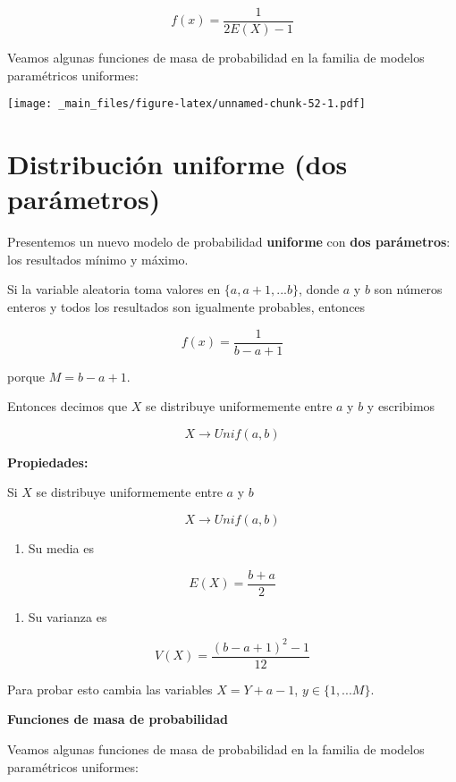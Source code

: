 \documentclass[
]{book}
\providecommand{\tightlist}{%
  \setlength{\itemsep}{0pt}\setlength{\parskip}{0pt}}
\begin{document}
\[f(x)=\frac{1}{2E(X)-1}\]

Veamos algunas funciones de masa de probabilidad en la familia de modelos paramétricos uniformes:

\texttt{[image: \_main\_files/figure-latex/unnamed-chunk-52-1.pdf]}

\hypertarget{distribuciuxf3n-uniforme-dos-paruxe1metros}{%
\section{Distribución uniforme (dos parámetros)}\label{distribuciuxf3n-uniforme-dos-paruxe1metros}}

Presentemos un nuevo modelo de probabilidad \textbf{uniforme} con \textbf{dos parámetros}: los resultados mínimo y máximo.

Si la variable aleatoria toma valores en \(\{a, a+1, ...b\}\), donde \(a\) y \(b\) son números enteros y todos los resultados son igualmente probables, entonces

\[f(x)=\frac{1}{b-a+1}\]

porque \(M=b-a+1\).

Entonces decimos que \(X\) se distribuye uniformemente entre \(a\) y \(b\) y escribimos

\[X \rightarrow Unif(a,b)\]

\textbf{Propiedades:}

Si \(X\) se distribuye uniformemente entre \(a\) y \(b\)

\[X \rightarrow Unif(a,b)\]

\begin{enumerate}
\def\labelenumi{\arabic{enumi})}
\tightlist
\item
  Su media es
\end{enumerate}

\[E(X)= \frac{b+a}{2}\]

\begin{enumerate}
\def\labelenumi{\arabic{enumi})}
\setcounter{enumi}{1}
\tightlist
\item
  Su varianza es
\end{enumerate}

\[V(X)= \frac{(b-a+1)^2-1}{12}\]

Para probar esto cambia las variables \(X=Y+a-1\), \(y \in \{1,...M\}\).

\textbf{Funciones de masa de probabilidad}

Veamos algunas funciones de masa de probabilidad en la familia de modelos paramétricos uniformes:
\end{document}
